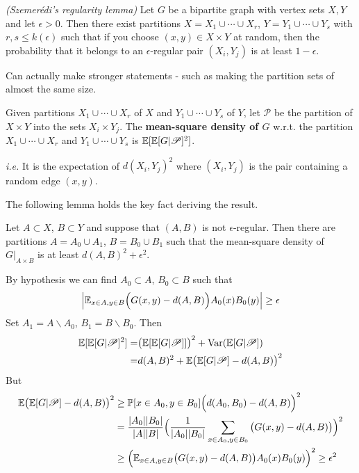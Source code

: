 \documentclass[12pt,a4paper]{report}
\newenvironment{proof}
{\begin{changemargin}{1cm}{0.5cm}
	}%
	{\end{changemargin}
}
\begin{document}
 \emph{(Szemer\'{e}di's regularity lemma)} Let $G$ be a bipartite graph with vertex sets $X,Y$ and let $\epsilon>0$. Then there exist partitions $X = X_1 \cup \cdots \cup X_r$, $Y = Y_1\cup \cdots \cup Y_s$ with $r,s\leq k(\epsilon)$ such that if you choose $(x,y) \in X\times Y$ at random, then the probability that it belongs to an $\epsilon$-regular pair $(X_i, Y_j)$ is at least $1-\epsilon$.
\s

Can actually make stronger statements - such as making the partition sets of almost the same size.
\s

 Given partitions $X_1 \cup \cdots \cup X_r$ of $X$ and $Y_1 \cup \cdots \cup Y_s$ of $Y$, let $\mathscr{P}$ be the partition of $X\times Y$ into the sets $X_i \times Y_j$. The \textbf{mean-square density of $G$} w.r.t. the partition $X_1 \cup \cdots \cup X_r$ and $Y_1 \cup \cdots \cup Y_s$ is $\mathbb{E}[\mathbb{E}[G|\mathscr{P}]^2]$.

\emph{i.e.} It is the expectation of $d(X_i, Y_j)^2$ where $(X_i, Y_j)$ is the pair containing a random edge $(x,y)$.
\s

The following lemma holds the key fact deriving the result.
\s

 Let $A\subset X$, $B\subset Y$ and suppose that $(A,B)$ is not $\epsilon$-regular. Then there are partitions $A = A_0 \cup A_1$, $B =B_0 \cup B_1$ such that the mean-square density of $G\big|_{A\times B}$ is at least $d(A,B)^2 + \epsilon^2$.
\begin{proof}
\pf By hypothesis we can find $A_0 \subset A$, $B_0\subset B$ such that 
\begin{align*}
\Big| \mathbb{E}_{x\in A, y\in B} \Big(G(x,y) - d(A,B) \Big) A_0(x) B_0(y) \Big| \geq \epsilon
\end{align*}
Set $A_1 = A \backslash A_0$, $B_1 = B \backslash B_0$. Then
\begin{align*}
\mathbb{E}[\mathbb{E}[G|\mathscr{P}]^2] =& \big( \mathbb{E}[\mathbb{E}[G|\mathscr{P}]] \big)^2 + \text{Var}(\mathbb{E}[G|\mathscr{P}]) \\
=& d(A,B)^2 + \mathbb{E} \big( \mathbb{E}[G|\mathscr{P}] - d(A,B) \big)^2
\end{align*}
But
\begin{align*}
\mathbb{E} \big( \mathbb{E}[G|\mathscr{P}] - d(A,B) \big)^2 & \geq \mathbb{P} [x\in A_0, y\in B_0] \Big( d(A_0, B_0) - d(A,B) \Big)^2 \\
& =  \frac{|A_0| |B_0|}{|A||B|} \Big( \frac{1}{|A_0||B_0|} \sum_{x\in A_0,y\in B_0} \big(G(x,y)-d(A,B)\big) \Big)^2 \\
& \geq \Big( \mathbb{E}_{x\in A, y\in B} \big(G(x,y)-d(A,B)\big) A_0(x) B_0(y) \Big)^2 \geq \epsilon^2
\end{align*}

\eop
\end{proof}
\s
\end{document}
